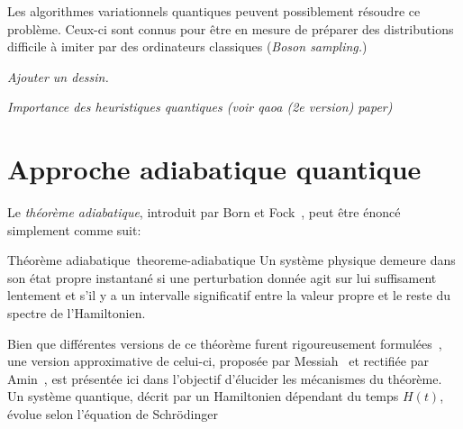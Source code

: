 Les algorithmes variationnels quantiques peuvent possiblement résoudre ce problème. Ceux-ci sont connus pour être en mesure de préparer des distributions difficile à imiter par des ordinateurs classiques (\textcolor{mydarkred}{\textit{Boson sampling.}})


\textcolor{mydarkred}{\textit{Ajouter un dessin.}}

\textcolor{mydarkred}{\textit{Importance des heuristiques quantiques (voir qaoa (2e version) paper)}}


\section{Approche adiabatique quantique}

Le \textit{théorème adiabatique}, introduit par Born et Fock~\cite{bornBeweisAdiabatensatzes1928}, peut être énoncé simplement comme suit:

\begin{subtheorem}{Théorème adiabatique~\cite{bornBeweisAdiabatensatzes1928}}{theoreme-adiabatique}
    Un système physique demeure dans son état propre instantané si une perturbation donnée agit sur lui suffisament lentement et s'il y a un intervalle significatif entre la valeur propre et le reste du spectre de l'Hamiltonien.
\end{subtheorem}

Bien que différentes versions de ce théorème furent rigoureusement formulées~\cite{albashAdiabaticQuantumComputing2018}, une version approximative de celui-ci, proposée par Messiah~\cite{messiahQuantumMechanics1999} et rectifiée par Amin~\cite{aminConsistencyAdiabaticTheorem2009}, est présentée ici dans l'objectif d'élucider les mécanismes du théorème. Un système quantique, décrit par un Hamiltonien dépendant du temps $H(t)$, évolue selon l'équation de Schrödinger

